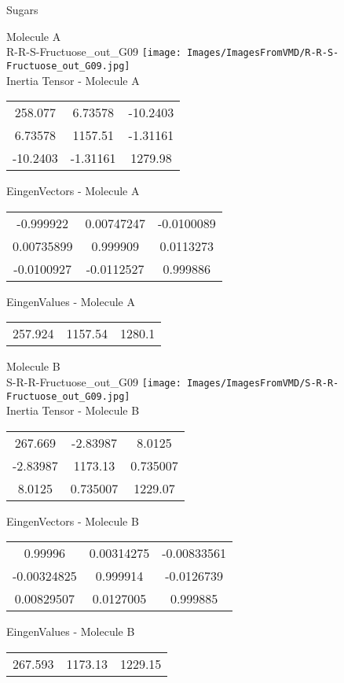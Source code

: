 \vtab[-2cm]
\begin{center}
{\large Sugars}
\end{center}
\begin{multicols}{2}
\begin{center}
Molecule A \\ 
R-R-S-Fructuose\_out\_G09
\texttt{[image: Images/ImagesFromVMD/R-R-S-Fructuose\_out\_G09.jpg]}
\\
Inertia Tensor - Molecule A \\
\vtab
\begin{tabular}{|c c c|}
258.077	 & 	6.73578	 & 	-10.2403	 \\
6.73578	 & 	1157.51	 & 	-1.31161	 \\
-10.2403	 & 	-1.31161	 & 	1279.98
\end{tabular}

\vtab
 EingenVectors - Molecule A     \\
\vtab
\begin{tabular}{|c c c|}
-0.999922	 & 	0.00747247	 & 	-0.0100089	 \\
0.00735899	 & 	0.999909	 & 	0.0113273	 \\
-0.0100927	 & 	-0.0112527	 & 	0.999886
\end{tabular}

\vtab
 EingenValues - Molecule A     \\
\vtab
\begin{tabular}{|c c c|}
257.924	 & 	1157.54	 & 	1280.1
\end{tabular}
\columnbreak

Molecule B \\ 
S-R-R-Fructuose\_out\_G09
\texttt{[image: Images/ImagesFromVMD/S-R-R-Fructuose\_out\_G09.jpg]}
\\
Inertia Tensor - Molecule B \\
\vtab
\begin{tabular}{|c c c|}
267.669	 & 	-2.83987	 & 	8.0125	 \\
-2.83987	 & 	1173.13	 & 	0.735007	 \\
8.0125	 & 	0.735007	 & 	1229.07
\end{tabular}

\vtab
 EingenVectors - Molecule B     \\
\vtab
\begin{tabular}{|c c c|}
0.99996	 & 	0.00314275	 & 	-0.00833561	 \\
-0.00324825	 & 	0.999914	 & 	-0.0126739	 \\
0.00829507	 & 	0.0127005	 & 	0.999885
\end{tabular}

\vtab
 EingenValues - Molecule B     \\
\vtab
\begin{tabular}{|c c c|}
267.593	 & 	1173.13	 & 	1229.15
\end{tabular}

\end{center}
\end{multicols}
